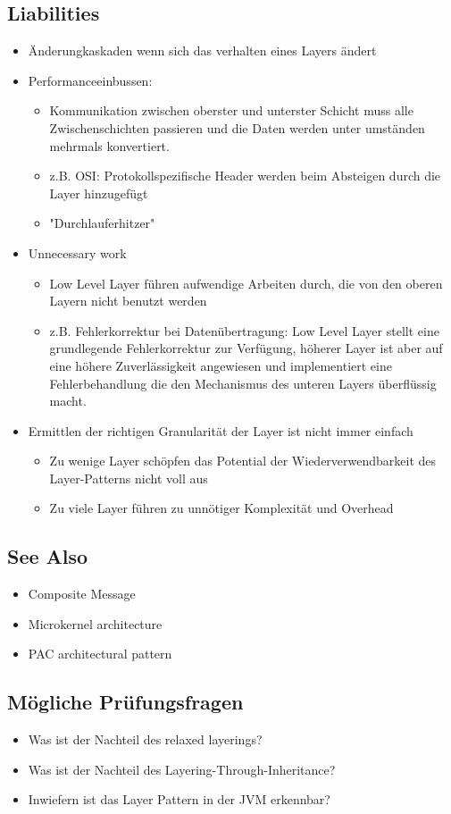 \subsection*{Liabilities}

\begin{itemize}
	\item Änderungkaskaden wenn sich das verhalten eines Layers ändert

	\item Performanceeinbussen:
	\begin{itemize}
		\item Kommunikation zwischen oberster und unterster Schicht muss alle Zwischenschichten passieren und die Daten werden unter umständen mehrmals konvertiert.
		\item z.B. OSI: Protokollspezifische Header werden beim Absteigen durch die Layer hinzugefügt
		\item "Durchlauferhitzer"
	\end{itemize}

	\item Unnecessary work
	\begin{itemize}
		\item Low Level Layer führen aufwendige Arbeiten durch, die von den oberen Layern nicht benutzt werden
		\item z.B. Fehlerkorrektur bei Datenübertragung: Low Level Layer stellt eine grundlegende Fehlerkorrektur zur Verfügung, höherer Layer ist aber auf eine höhere Zuverlässigkeit angewiesen und implementiert eine Fehlerbehandlung die den Mechanismus des unteren Layers überflüssig macht.
	\end{itemize}
	\item Ermittlen der richtigen Granularität der Layer ist nicht immer einfach
	\begin{itemize}
		\item Zu wenige Layer schöpfen das Potential der Wiederverwendbarkeit des Layer-Patterns nicht voll aus
		\item Zu viele Layer führen zu unnötiger Komplexität und Overhead
	\end{itemize}
\end{itemize}

\subsection*{See Also}
\begin{itemize}
	\item Composite Message
	\item Microkernel architecture
	\item PAC architectural pattern
\end{itemize}


\subsection*{Mögliche Prüfungsfragen}
\begin{itemize}
	\item Was ist der Nachteil des relaxed layerings?
	\item Was ist der Nachteil des Layering-Through-Inheritance?
	\item Inwiefern ist das Layer Pattern in der JVM erkennbar?
\end{itemize}

